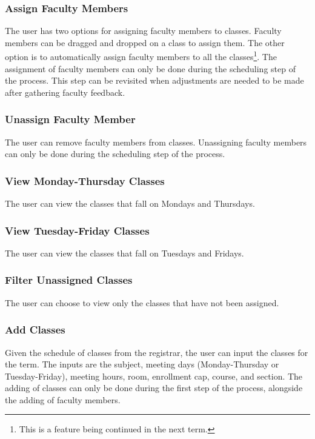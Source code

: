         \subsubsection{Assign Faculty Members}
        The user has two options for assigning faculty members to classes. Faculty members can be dragged and dropped on a class to assign them. The other option is to automatically assign faculty members to all the classes\footnote{This is a feature being continued in the next term.}. The assignment of faculty members can only be done during the scheduling step of the process. This step can be revisited when adjustments are needed to be made after gathering faculty feedback.
        
        \subsubsection{Unassign Faculty Member}
        The user can remove faculty members from classes. Unassigning faculty members can only be done during the scheduling step of the process.
        
        \subsubsection{View Monday-Thursday Classes}
        The user can view the classes that fall on Mondays and Thursdays.
        
        \subsubsection{View Tuesday-Friday Classes}
        The user can view the classes that fall on Tuesdays and Fridays.
        
        \subsubsection{Filter Unassigned Classes}
        The user can choose to view only the classes that have not been assigned.
        
        \subsubsection{Add Classes}
        Given the schedule of classes from the registrar, the user can input the classes for the term. The inputs are the subject, meeting days (Monday-Thursday or Tuesday-Friday), meeting hours, room, enrollment cap, course, and section. The adding of classes can only be done during the first step of the process, alongside the adding of faculty members.
        
